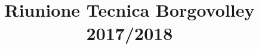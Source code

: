 \documentclass{beamer}
\title[Borgovolley 2017/2018]{Riunione Tecnica Borgovolley 2017/2018}
\date[24 Agosto 2017]{}
\begin{document}
\begin{frame}
\maketitle
\end{frame}
\end{document}

